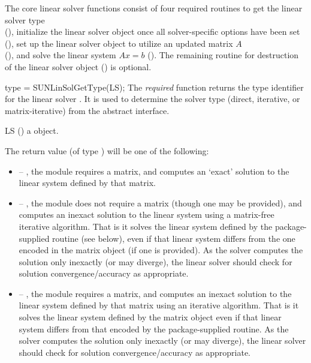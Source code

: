 The core linear solver functions consist of four required routines to get
the linear solver type \\ \noindent (), initialize
the linear solver object once all solver-specific options have been
set (), set up the linear solver object
to utilize an updated matrix $A$ \\ \noindent (),
and solve the linear system $Ax=b$ ().
The remaining routine for destruction of the linear solver object
() is optional.

{
  type = SUNLinSolGetType(LS);
}
{
  The \textit{required} function  returns the
  type identifier for the linear solver . It is used to
  determine the solver type (direct, iterative, or matrix-iterative) from
  the abstract  interface.
}
{
  \begin{args}[LS]
  \item[LS] ()
    a {\sunlinsol} object.
  \end{args}
}
{
  The return value  (of type ) will be one of the
  following:
  \begin{itemize}
  \item {} -- , the {\sunlinsol} module requires
  a matrix, and computes an `exact' solution to the linear system defined by
  that matrix.
  \item {} -- , the {\sunlinsol} module does
  not require a matrix (though one may be provided), and computes an inexact
  solution to the linear system using a matrix-free iterative algorithm. That is
  it solves the linear system defined by the package-supplied 
  routine (see  below), even if that linear
  system differs from the one encoded in the matrix object (if one is
  provided). As the solver computes the solution only inexactly (or may
  diverge), the linear solver should check for solution convergence/accuracy as
  appropriate. 
  \item {} -- , the {\sunlinsol}
  module requires a matrix, and computes an inexact solution to the linear
  system defined by that matrix using an iterative algorithm. That is it solves
  the linear system defined by the matrix object even if that linear system
  differs from that encoded by the package-supplied  routine. As the
  solver computes the solution only inexactly (or may diverge), the linear
  solver should check for solution convergence/accuracy as appropriate.
  \end{itemize}
}
